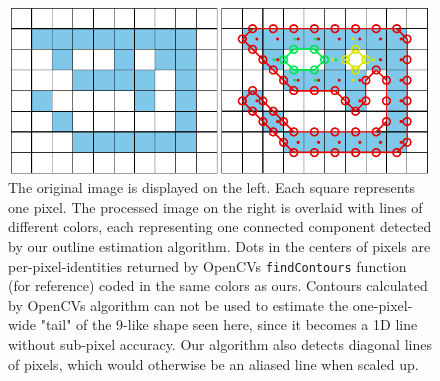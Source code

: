 \documentclass[9pt,lineno]{elife}
\begin{document}
\begin{figure}
    \centering
    \includegraphics[width=\textwidth]{figures/fig_outline.pdf}
    \caption{The original image is displayed on the left. Each square represents one pixel. The processed image on the right is overlaid with lines of different colors, each representing one connected component detected by our outline estimation algorithm. Dots in the centers of pixels are per-pixel-identities returned by OpenCVs \texttt{findContours} function (for reference) coded in the same colors as ours.  Contours calculated by OpenCVs algorithm can not be used to estimate the one-pixel-wide "tail" of the 9-like shape seen here, since it becomes a 1D line without sub-pixel accuracy. Our algorithm also detects diagonal lines of pixels, which would otherwise be an aliased line when scaled up.}
	\label{fig:outline_approx}
\end{figure}
\end{document}
